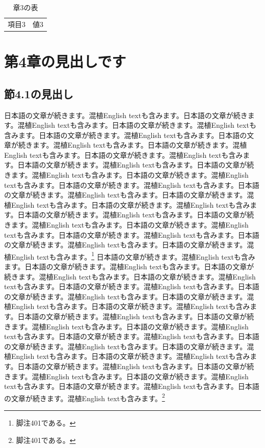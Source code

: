\documentclass[pdflatex,book]{jlreq}
\begin{document}
\begin{table}[htbp]\centering\caption{章3の表}\begin{tabular}{cc}項目3 & 値3\\\end{tabular}\end{table}

\chapter{第4章の見出しです}
\section{節4.1の見出し}
日本語の文章が続きます。混植English textも含みます。日本語の文章が続きます。混植English textも含みます。日本語の文章が続きます。混植English textも含みます。日本語の文章が続きます。混植English textも含みます。日本語の文章が続きます。混植English textも含みます。日本語の文章が続きます。混植English textも含みます。日本語の文章が続きます。混植English textも含みます。日本語の文章が続きます。混植English textも含みます。日本語の文章が続きます。混植English textも含みます。日本語の文章が続きます。混植English textも含みます。日本語の文章が続きます。混植English textも含みます。日本語の文章が続きます。混植English textも含みます。日本語の文章が続きます。混植English textも含みます。日本語の文章が続きます。混植English textも含みます。日本語の文章が続きます。混植English textも含みます。日本語の文章が続きます。混植English textも含みます。日本語の文章が続きます。混植English textも含みます。日本語の文章が続きます。混植English textも含みます。日本語の文章が続きます。混植English textも含みます。日本語の文章が続きます。混植English textも含みます。\footnote{脚注401である。}
日本語の文章が続きます。混植English textも含みます。日本語の文章が続きます。混植English textも含みます。日本語の文章が続きます。混植English textも含みます。日本語の文章が続きます。混植English textも含みます。日本語の文章が続きます。混植English textも含みます。日本語の文章が続きます。混植English textも含みます。日本語の文章が続きます。混植English textも含みます。日本語の文章が続きます。混植English textも含みます。日本語の文章が続きます。混植English textも含みます。日本語の文章が続きます。混植English textも含みます。日本語の文章が続きます。混植English textも含みます。日本語の文章が続きます。混植English textも含みます。日本語の文章が続きます。混植English textも含みます。日本語の文章が続きます。混植English textも含みます。日本語の文章が続きます。混植English textも含みます。日本語の文章が続きます。混植English textも含みます。日本語の文章が続きます。混植English textも含みます。日本語の文章が続きます。混植English textも含みます。日本語の文章が続きます。混植English textも含みます。日本語の文章が続きます。混植English textも含みます。\footnote{脚注401である。}
\end{document}
